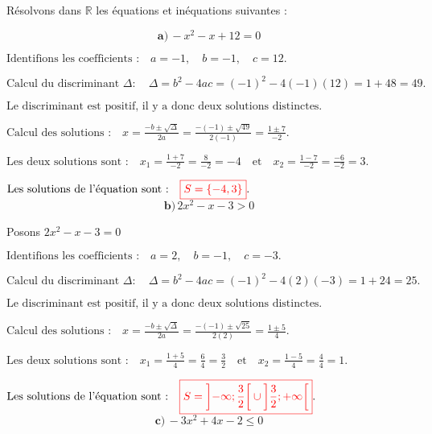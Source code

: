 \documentclass[12pt,a4paper]{article}
\begin{document}
Résolvons dans \(\mathbb{R}\) les équations et inéquations suivantes :


\[ \textbf{a)} \, -x^2 - x + 12 = 0 \]

\(
\text{Identifions les coefficients :} \quad a = -1, \quad b = -1, \quad c = 12.
\)

\(
\text{Calcul du discriminant } \Delta : \quad
\Delta = b^2 - 4ac = (-1)^2 - 4(-1)(12) = 1 + 48 = 49.
\)

\(
\text{Le discriminant est positif, il y a donc deux solutions distinctes.}
\)

\(
\text{Calcul des solutions :} \quad
x = \frac{-b \pm \sqrt{\Delta}}{2a} = \frac{-(-1) \pm \sqrt{49}}{2(-1)} = \frac{1 \pm 7}{-2}.
\)

\(
\text{Les deux solutions sont :} \quad
x_1 = \frac{1 + 7}{-2} = \frac{8}{-2} = -4 \quad \text{et} \quad x_2 = \frac{1 - 7}{-2} = \frac{-6}{-2} = 3.
\)

\(
\text{Les solutions de l'équation sont :} \quad
\textcolor{red}{\boxed{S=\left\lbrace  -4 , 3\right\rbrace  }}.
\)
\\
\[
\textbf{b)} \, 2x^2 - x - 3 > 0
\]

Posons \( 2x^2 - x - 3 = 0 \)

\(
\text{Identifions les coefficients :} \quad a = 2, \quad b = -1, \quad c = -3.
\)

\(
\text{Calcul du discriminant } \Delta : \quad
\Delta = b^2 - 4ac = (-1)^2 - 4(2)(-3) = 1 + 24  = 25.
\)

\(
\text{Le discriminant est positif, il y a donc deux solutions distinctes.}
\)

\(
\text{Calcul des solutions :} \quad
x = \frac{-b \pm \sqrt{\Delta}}{2a} = \frac{-(-1) \pm \sqrt{25}}{2(2)} = \frac{1 \pm 5}{4}.
\)

\(
\text{Les deux solutions sont :} \quad
x_1 = \frac{1 + 5}{4} = \frac{6}{4} = \frac{3}{2} \quad \text{et} \quad x_2 = \frac{1 - 5}{4} = \frac{4}{4} = 1.
\)


\(
\text{Les solutions de l'équation sont :} \quad
\textcolor{red}{\boxed{S=\left]-\infty;\frac{3}{2} \right[ \cup\left] \frac{3}{2};+\infty \right[ }}.
\)
\\
\[ \textbf{c)} \, -3x^2 + 4x - 2 \leq 0 \]
\end{document}
